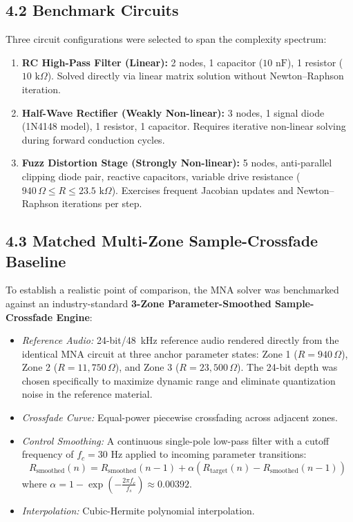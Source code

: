 \documentclass[fleqn,draft]{jaes}
\begin{document}
\subsection{4.2 Benchmark Circuits}
Three circuit configurations were selected to span the complexity spectrum:
\begin{enumerate}
\item \textbf{RC High-Pass Filter (Linear):} 2 nodes, 1 capacitor ($10\text{ nF}$), 1 resistor ($10\text{ k}\Omega$). Solved directly via linear matrix solution without Newton--Raphson iteration.
\item \textbf{Half-Wave Rectifier (Weakly Non-linear):} 3 nodes, 1 signal diode (1N4148 model), 1 resistor, 1 capacitor. Requires iterative non-linear solving during forward conduction cycles.
\item \textbf{Fuzz Distortion Stage (Strongly Non-linear):} 5 nodes, anti-parallel clipping diode pair, reactive capacitors, variable drive resistance ($940\,\Omega \le R \le 23.5\text{ k}\Omega$). Exercises frequent Jacobian updates and Newton--Raphson iterations per step.
\end{enumerate}

\subsection{4.3 Matched Multi-Zone Sample-Crossfade Baseline}
To establish a realistic point of comparison, the MNA solver was benchmarked against an industry-standard \textbf{3-Zone Parameter-Smoothed Sample-Crossfade Engine}:
\begin{itemize}
\item \textit{Reference Audio:} 24-bit/48~kHz reference audio rendered directly from the identical MNA circuit at three anchor parameter states: Zone 1 ($R = 940\,\Omega$), Zone 2 ($R = 11,750\,\Omega$), and Zone 3 ($R = 23,500\,\Omega$). The 24-bit depth was chosen specifically to maximize dynamic range and eliminate quantization noise in the reference material.
\item \textit{Crossfade Curve:} Equal-power piecewise crossfading across adjacent zones.
\item \textit{Control Smoothing:} A continuous single-pole low-pass filter with a cutoff frequency of $f_c = 30\text{ Hz}$ applied to incoming parameter transitions:
\begin{equation}
R_{\text{smoothed}}(n) = R_{\text{smoothed}}(n-1) + \alpha \left( R_{\text{target}}(n) - R_{\text{smoothed}}(n-1) \right)
\end{equation}
where $\alpha = 1 - \exp\left(-\frac{2\pi f_c}{f_s}\right) \approx 0.00392$.
\item \textit{Interpolation:} Cubic-Hermite polynomial interpolation.
\end{itemize}
\end{document}
